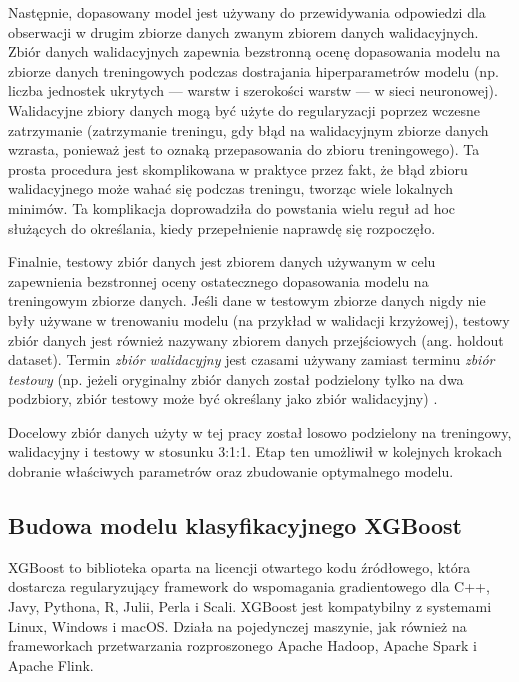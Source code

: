 \documentclass[polish, twoside, 12pt, a4paper]{article}
\theoremstyle{definition}
\theoremstyle{plain}
\theoremstyle{remark}
\begin{document}
Następnie, dopasowany model jest używany do przewidywania odpowiedzi dla obserwacji w drugim zbiorze danych zwanym zbiorem danych walidacyjnych. Zbiór danych walidacyjnych zapewnia bezstronną ocenę dopasowania modelu na zbiorze danych treningowych podczas dostrajania hiperparametrów modelu (np. liczba jednostek ukrytych --- warstw i szerokości warstw --- w sieci neuronowej). Walidacyjne zbiory danych mogą być użyte do regularyzacji poprzez wczesne zatrzymanie (zatrzymanie treningu, gdy błąd na walidacyjnym zbiorze danych wzrasta, ponieważ jest to oznaką przepasowania do zbioru treningowego). Ta prosta procedura jest skomplikowana w praktyce przez fakt, że błąd zbioru walidacyjnego może wahać się podczas treningu, tworząc wiele lokalnych minimów. Ta komplikacja doprowadziła do powstania wielu reguł ad hoc służących do określania, kiedy przepełnienie naprawdę się rozpoczęło.

Finalnie, testowy zbiór danych jest zbiorem danych używanym w celu zapewnienia bezstronnej oceny ostatecznego dopasowania modelu na treningowym zbiorze danych. Jeśli dane w testowym zbiorze danych nigdy nie były używane w trenowaniu modelu (na przykład w walidacji krzyżowej), testowy zbiór danych jest również nazywany zbiorem danych przejściowych (ang. holdout dataset). Termin \emph{zbiór walidacyjny} jest czasami używany zamiast terminu \emph{zbiór testowy} (np. jeżeli oryginalny zbiór danych został podzielony tylko na dwa podzbiory, zbiór testowy może być określany jako zbiór walidacyjny) \cite{brownlee2017}.

Docelowy zbiór danych użyty w tej pracy został losowo podzielony na treningowy, walidacyjny i testowy w stosunku 3:1:1. Etap ten umożliwił w kolejnych krokach dobranie właściwych parametrów oraz zbudowanie optymalnego modelu.

\subsection{Budowa modelu klasyfikacyjnego XGBoost}

XGBoost to biblioteka oparta na licencji otwartego kodu źródłowego, która dostarcza regularyzujący framework do wspomagania gradientowego dla C++, Javy, Pythona, R, Julii, Perla i Scali. XGBoost jest kompatybilny z systemami Linux, Windows i macOS. Działa na pojedynczej maszynie, jak również na frameworkach przetwarzania rozproszonego Apache Hadoop, Apache Spark i Apache Flink. 
\end{document}
